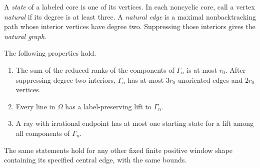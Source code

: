 A \emph{state} of a labeled core is one of its vertices. In each
noncyclic core, call a vertex \emph{natural} if its degree is at least
three. A \emph{natural edge} is a maximal nonbacktracking path whose interior vertices
have degree two. Suppressing those interiors gives the \emph{natural
graph}.

\begin{lemma}
\label{car:window-cores}
The following properties hold.
\begin{enumerate}
\item The sum of the reduced ranks of the components of $\Gamma_n$
is at most $r_0$.  After suppressing degree-two interiors, $\Gamma_n$
has at most $3r_0$ unoriented edges and $2r_0$ vertices.
\item Every line in $\Omega$ has a label-preserving lift to $\Gamma_n$.
\item A ray with irrational endpoint has at most one starting state
for a lift among all components of $\Gamma_n$.
\end{enumerate}
The same statements hold for any other fixed finite positive window
shape containing its specified central edge, with the same bounds.
\end{lemma}

